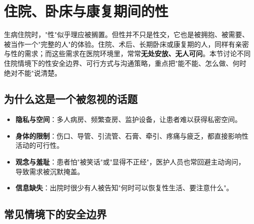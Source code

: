 \section{住院、卧床与康复期间的性}

生病住院时，"性"似乎理应被搁置。但性并不只是性交，它也是被拥抱、被需要、被当作一个"完整的人"的体验。住院、术后、长期卧床或康复期的人，同样有亲密与性的需求；而这些需求在医院环境里，常常\textbf{无处安放、无人可问}。本节讨论不同住院情境下的性安全边界、可行方式与沟通策略，重点把"能不能、怎么做、何时绝对不能"说清楚。

\subsection{为什么这是一个被忽视的话题}

\begin{itemize}
	\item \textbf{隐私与空间}：多人病房、频繁查房、监护设备，让患者难以获得私密空间。
	\item \textbf{身体的限制}：伤口、导管、引流管、石膏、牵引、疼痛与疲乏，都直接影响性活动的可行性。
	\item \textbf{观念与羞耻}：患者怕"被笑话"或"显得不正经"，医护人员也常回避主动询问，导致需求被沉默掩盖。
	\item \textbf{信息缺失}：出院时很少有人被告知"何时可以恢复性生活、要注意什么"。
\end{itemize}

\subsection{常见情境下的安全边界}

